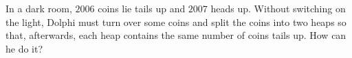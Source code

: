 In a dark room, $2006$ coins lie tails up and $2007$ heads up. Without switching on the light, Dolphi must turn over some coins and split the coins into two heaps so that, afterwards, each heap contains the same number of coins tails up. How can he do it?
